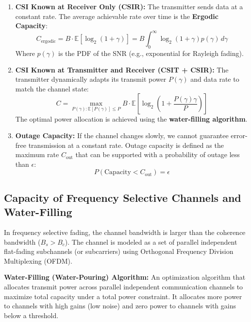 \documentclass[12pt,a4paper]{article}
\begin{document}
\begin{enumerate}[label=\textbf{\arabic*.}, leftmargin=*, itemsep=3.5pt]
  \item \textbf{CSI Known at Receiver Only (CSIR):} The transmitter sends data at a constant rate. The average achievable rate over time is the \textbf{Ergodic Capacity}:
    \begin{equation}
      C_{\text{ergodic}} = B \cdot \mathbb{E}\left[ \log_2(1 + \gamma) \right] = B \int_{0}^{\infty} \log_2(1 + \gamma) p(\gamma) \, d\gamma
    \end{equation}
    Where $p(\gamma)$ is the PDF of the SNR (e.g., exponential for Rayleigh fading).
  \item \textbf{CSI Known at Transmitter and Receiver (CSIT + CSIR):} The transmitter dynamically adapts its transmit power $P(\gamma)$ and data rate to match the channel state:
    \begin{equation}
      C = \max_{P(\gamma): \mathbb{E}[P(\gamma)] \le P} B \cdot \mathbb{E}\left[ \log_2\left(1 + \frac{P(\gamma)\gamma}{P}\right) \right]
    \end{equation}
    The optimal power allocation is achieved using the \textbf{water-filling algorithm}.
  \item \textbf{Outage Capacity:} If the channel changes slowly, we cannot guarantee error-free transmission at a constant rate. Outage capacity is defined as the maximum rate $C_{\text{out}}$ that can be supported with a probability of outage less than $\epsilon$:
    \begin{equation}
      P(\text{Capacity} < C_{\text{out}}) = \epsilon
    \end{equation}
\end{enumerate}

\subsection{Capacity of Frequency Selective Channels and Water-Filling}
In frequency selective fading, the channel bandwidth is larger than the coherence bandwidth ($B_s > B_c$). The channel is modeled as a set of parallel independent flat-fading subchannels (or subcarriers) using Orthogonal Frequency Division Multiplexing (OFDM).

\begin{tcolorbox}[defbox]
\textbf{Water-Filling (Water-Pouring) Algorithm:} An optimization algorithm that allocates transmit power across parallel independent communication channels to maximize total capacity under a total power constraint. It allocates more power to channels with high gains (low noise) and zero power to channels with gains below a threshold.
\end{tcolorbox}
\end{document}
